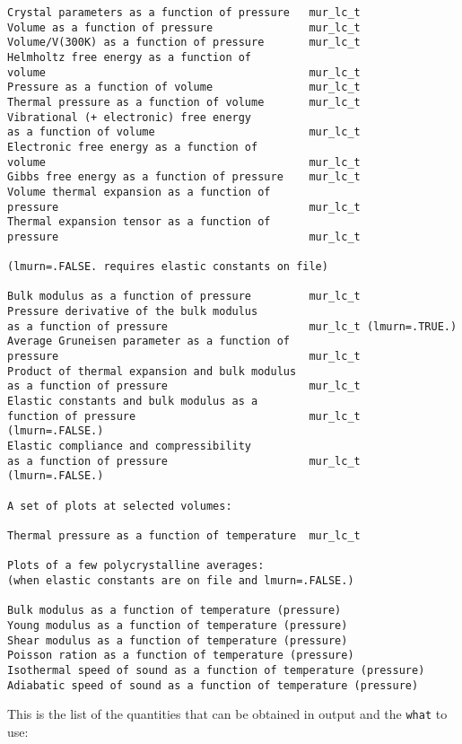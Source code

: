\documentclass[12pt,a4paper,twoside]{report}
\begin{document}
\begin{footnotesize}
\begin{verbatim}
Crystal parameters as a function of pressure   mur_lc_t
Volume as a function of pressure               mur_lc_t
Volume/V(300K) as a function of pressure       mur_lc_t
Helmholtz free energy as a function of         
volume                                         mur_lc_t
Pressure as a function of volume               mur_lc_t
Thermal pressure as a function of volume       mur_lc_t
Vibrational (+ electronic) free energy         
as a function of volume                        mur_lc_t
Electronic free energy as a function of        
volume                                         mur_lc_t
Gibbs free energy as a function of pressure    mur_lc_t
Volume thermal expansion as a function of 
pressure                                       mur_lc_t
Thermal expansion tensor as a function of 
pressure                                       mur_lc_t

(lmurn=.FALSE. requires elastic constants on file)

Bulk modulus as a function of pressure         mur_lc_t
Pressure derivative of the bulk modulus        
as a function of pressure                      mur_lc_t (lmurn=.TRUE.)
Average Gruneisen parameter as a function of   
pressure                                       mur_lc_t
Product of thermal expansion and bulk modulus
as a function of pressure                      mur_lc_t
Elastic constants and bulk modulus as a 
function of pressure                           mur_lc_t (lmurn=.FALSE.)
Elastic compliance and compressibility
as a function of pressure                      mur_lc_t (lmurn=.FALSE.)

A set of plots at selected volumes:

Thermal pressure as a function of temperature  mur_lc_t

Plots of a few polycrystalline averages:
(when elastic constants are on file and lmurn=.FALSE.) 

Bulk modulus as a function of temperature (pressure)
Young modulus as a function of temperature (pressure)
Shear modulus as a function of temperature (pressure)
Poisson ration as a function of temperature (pressure)
Isothermal speed of sound as a function of temperature (pressure)
Adiabatic speed of sound as a function of temperature (pressure)

\end{verbatim}
\end{footnotesize}

\newpage

This is the list of the quantities that can be obtained in output
and the \texttt{what} to use:
\end{document}
